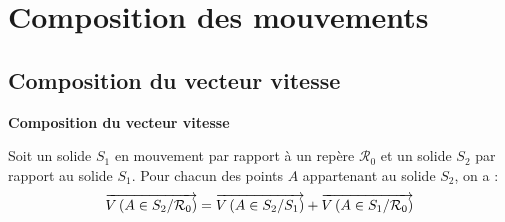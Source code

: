 \documentclass[10pt,oneside]{article}
\begin{document}
%
%
%
%
%





\section{Composition des mouvements}
\subsection{Composition du vecteur vitesse}
\begin{resultat}
\textbf{Composition du vecteur vitesse}
\label{ref_va}

Soit un solide $S_1$ en mouvement par rapport à un repère $\mathcal{R}_0$ et un solide $S_2$ par rapport au solide $S_1$. Pour chacun des points $A$ appartenant au solide $S_2$, on a :
$$
\overrightarrow{V\left( {A} \in {S_2}/{\mathcal{R}_0}\right)}=
\overrightarrow{V\left( {A} \in {S_2}/{S_1}\right)}+\overrightarrow{V\left( {A} \in {S_1}/{\mathcal{R}_0}\right)}
$$
\end{resultat}
\end{document}
